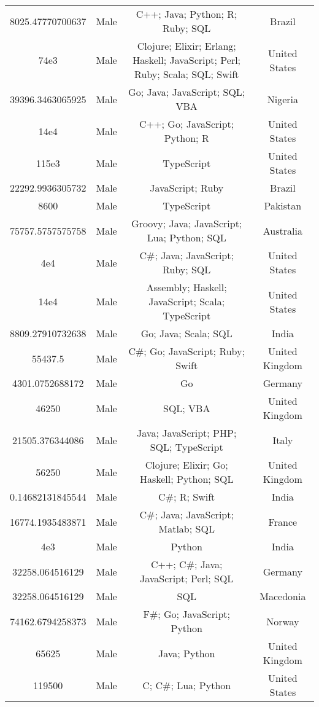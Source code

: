 \begin{center}
\begin{tabular}{ |c|c|c|c| }
8025.47770700637  &  Male  &  C++; Java; Python; R; Ruby; SQL  &  Brazil  \\ 
74e3  &  Male  &  Clojure; Elixir; Erlang; Haskell; JavaScript; Perl; Ruby; Scala; SQL; Swift  &  United States  \\ 
39396.3463065925  &  Male  &  Go; Java; JavaScript; SQL; VBA  &  Nigeria  \\ 
14e4  &  Male  &  C++; Go; JavaScript; Python; R  &  United States  \\ 
115e3  &  Male  &  TypeScript  &  United States  \\ 
22292.9936305732  &  Male  &  JavaScript; Ruby  &  Brazil  \\ 
8600  &  Male  &  TypeScript  &  Pakistan  \\ 
75757.5757575758  &  Male  &  Groovy; Java; JavaScript; Lua; Python; SQL  &  Australia  \\ 
4e4  &  Male  &  C\#; Java; JavaScript; Ruby; SQL  &  United States  \\ 
14e4  &  Male  &  Assembly; Haskell; JavaScript; Scala; TypeScript  &  United States  \\ 
8809.27910732638  &  Male  &  Go; Java; Scala; SQL  &  India  \\ 
55437.5  &  Male  &  C\#; Go; JavaScript; Ruby; Swift  &  United Kingdom  \\ 
4301.0752688172  &  Male  &  Go  &  Germany  \\ 
46250  &  Male  &  SQL; VBA  &  United Kingdom  \\ 
21505.376344086  &  Male  &  Java; JavaScript; PHP; SQL; TypeScript  &  Italy  \\ 
56250  &  Male  &  Clojure; Elixir; Go; Haskell; Python; SQL  &  United Kingdom  \\ 
0.14682131845544  &  Male  &  C\#; R; Swift  &  India  \\ 
16774.1935483871  &  Male  &  C\#; Java; JavaScript; Matlab; SQL  &  France  \\ 
4e3  &  Male  &  Python  &  India  \\ 
32258.064516129  &  Male  &  C++; C\#; Java; JavaScript; Perl; SQL  &  Germany  \\ 
32258.064516129  &  Male  &  SQL  &  Macedonia  \\ 
74162.6794258373  &  Male  &  F\#; Go; JavaScript; Python  &  Norway  \\ 
65625  &  Male  &  Java; Python  &  United Kingdom  \\ 
119500  &  Male  &  C; C\#; Lua; Python  &  United States  \\ 

\end{tabular}
\end{center}
